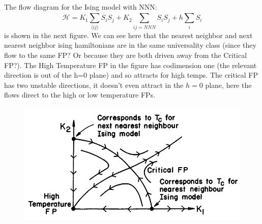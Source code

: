 	The flow diagram for the Ising model with NNN:
	\begin{equation}
		\mathcal{H} =	K_1 \sum_{\langle ij \rangle} {S_i S_j} + K_2 \sum_{ij = NNN}^{} S_i S_j + h \sum_{i}^{} S_i
	\end{equation}
	is shown in the next figure. We can see here that the nearest neighbor and next nearest neighbor ising hamiltonians are in the same universality class (since they flow to the same FP? Or because they are both driven away from the Critical FP?). The High Temperature FP in the figure has codimension one (the relevant direction is out of the h=0 plane) and so attracts for high temps. The critical FP has two unstable directions, it doesn't even attract in the $h=0$ plane, here the flows direct to the high or low temperature FPs.
	\begin{figure}[htp]
		\centering
		\includegraphics[width=12cm]{graphics/FP-Phase-Diagram.png}
	\end{figure}
	

